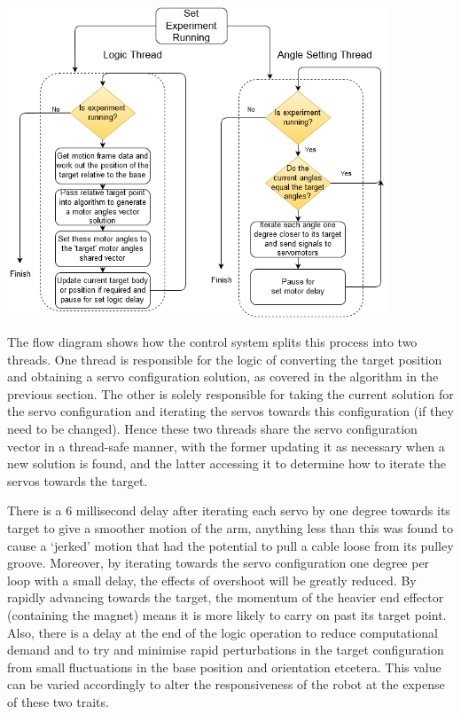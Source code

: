 \documentclass[11pt]{article}
\begin{document}
\begin{center}
\includegraphics[width=0.85\textwidth]{images/separateThreads2.png}
\label{figure:separateThreads}
\end{center}

The flow diagram shows how the control system splits this process into two threads. One thread is responsible for the logic of converting the target position and obtaining a servo configuration solution, as covered in the algorithm in the previous section. The other is solely responsible for taking the current solution for the servo configuration and iterating the servos towards this configuration (if they need to be changed). Hence these two threads share the servo configuration vector in a thread-safe manner, with the former updating it as necessary when a new solution is found, and the latter accessing it to determine how to iterate the servos towards the target. 

There is a 6 millisecond delay after iterating each servo by one degree towards its target to give a smoother motion of the arm, anything less than this was found to cause a `jerked' motion that had the potential to pull a cable loose from its pulley groove. Moreover, by iterating towards the servo configuration one degree per loop with a small delay, the effects of overshoot will be greatly reduced. By rapidly advancing towards the target, the momentum of the heavier end effector (containing the magnet) means it is more likely to carry on past its target point. Also, there is a delay at the end of the logic operation to reduce computational demand and to try and minimise rapid perturbations in the target configuration from small fluctuations in the base position and orientation etcetera. This value can be varied accordingly to alter the responsiveness of the robot at the expense of these two traits. 
\end{document}
